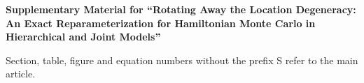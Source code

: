 \documentclass[12pt]{article}
\def\spacingset#1{\renewcommand{\baselinestretch}{#1}\small\normalsize}
\begin{document}
\begin{center}
{\LARGE\bf Supplementary Material for ``Rotating Away the Location
Degeneracy: An Exact Reparameterization for Hamiltonian Monte Carlo in
Hierarchical and Joint Models''}
\end{center}
\bigskip
\spacingset{1.5}
Section, table, figure and equation numbers without the prefix S refer to
the main article.


\end{document}
